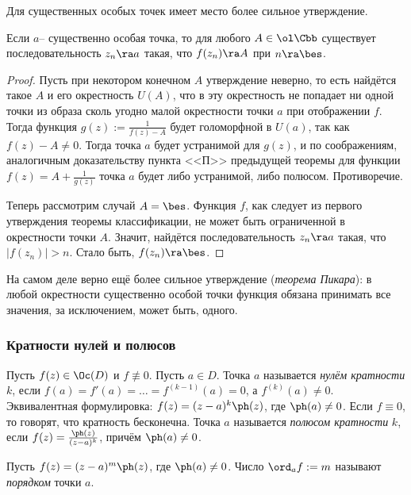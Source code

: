 \documentclass[a4paper]{article}
\begin{document}
Для существенных особых точек имеет место более сильное утверждение.

\begin{theorem}[Ю.\,В.\,Сохоцкого]
Если $a$-- существенно особая точка, то для любого $A\in \ol\Cbb$ существует последовательность
$z_n\ra a$ такая, что $f(z_n) \ra A$ при $n \ra \bes$.
\end{theorem}
\begin{proof}
Пусть при некотором конечном $A$ утверждение неверно, то есть найдётся такое $A$ и его окрестность $U(A)$, что
в эту окрестность не попадает ни одной точки из образа сколь угодно малой окрестности точки $a$ при отображении $f$.
Тогда функция $g(z) := \frac{1}{f(z)-A}$ будет голоморфной в $U(a)$, так как $f(z)-A \neq 0$. Тогда точка $a$ будет
устранимой для $g(z)$, и по соображениям, аналогичным доказательству пункта <<П>> предыдущей теоремы для функции
$f(z) = A + \frac{1}{g(z)}$ точка $a$ будет либо устранимой, либо полюсом. Противоречие.

Теперь рассмотрим случай $A = \bes$. Функция $f$, как следует из первого утверждения теоремы классификации,
не может быть ограниченной в окрестности точки $A$. Значит, найдётся последовательность $z_n\ra a$ такая,
что $|f(z_n)| > n$. Стало быть, $f(z_n)\ra\bes$.
\end{proof}

\begin{note}
На самом деле верно ещё более сильное утверждение (\emph{теорема Пикара}): в любой окрестности существенно
особой точки функция обязана принимать все значения, за исключением, может быть, одного.
\end{note}

\subsubsection{Кратности нулей и полюсов}

\begin{df}
Пусть $f(z)\in \Oc(D)$ и $f \not\equiv 0$. Пусть $a\in D$. Точка $a$ называется \emph{нулём кратности $k$},
если $f(a)=f'(a)= \ldots =f^{(k-1)}(a)=0$, а $f^{(k)}(a)\neq 0$.
Эквивалентная формулировка: $f(z)=(z-a)^k \ph(z)$, где $\ph(a)\ne 0$.
Если $f \equiv 0$, то говорят, что кратность бесконечна.
Точка $a$ называется \emph{полюсом кратности} $k$, если $f(z) = \frac{\ph(z)}{(z-a)^k}$, причём $\ph(a) \neq 0$.
\end{df}

\begin{df}
Пусть $f(z) = (z-a)^m\ph(z)$, где $\ph(a) \neq 0$. Число $\ord_a f := m$ называют \emph{порядком} точки $a$.
\end{df}
\end{document}
